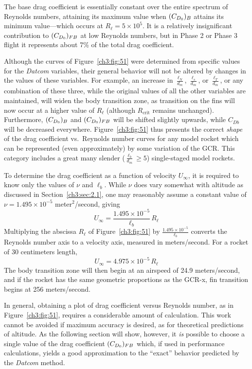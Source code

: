 The base drag coefficient is essentially constant over the entire spectrum of Reynolds numbers,
attaining its maximum value when $(C_{D_0})_B$ attains its minimum value---which occurs at
$R_\ell = 5 \times 10^{5}$. It is a relatively insignificant contribution to $(C_{D_0})_{FB}$ at low
Reynolds numbers, but in Phase 2 or Phase 3 flight it represents about 7\% of the total drag
coefficient.

Although the curves of Figure~\ref{ch3:fig:51} were determined from specific values for the
\emph{Datcom} variables, their general behavior will not be altered by changes in the values of
these variables. For example, an increase in $\frac{\ell_N}{d_m}$, $\frac{\ell_s}{d_m}$, or
$\frac{\ell_T}{d_m}$, or any combination of these three, while the original values of all the
other variables are maintained, will widen the body transition zone, as transition on the fins
will now occur at a higher value of $R_\ell$ (although $R_{\mathrm{crit}}$ remains unchanged).
Furthermore, $(C_{D_0})_B$ and $(C_{D_0})_{FB}$ will be shifted slightly upwards, while $C_{Db}$ will be
decreased everywhere. Figure~\ref{ch3:fig:51} thus presents the correct \emph{shape} of the drag
coefficient vs.\ Reynolds number curves for any model rocket which can be represented (even
approximately) by some variation of the GCR. This category includes a great many slender
($\frac{\ell_b}{d_m} \ge 5$) single-staged model rockets.

To determine the drag coefficient as a function of velocity $U_\infty$, it is required to know
only the values of $\nu$ and $\ell_b$. While $\nu$ does vary somewhat with altitude as discussed
in Section~\ref{ch3:sec:2.1}, one may reasonably assume a constant value of
$\nu = 1.495 \times 10^{-5}$ meter$^{2}$/second, giving
\begin{equation}\label{ch3:eq:207}
U_\infty = \frac{1.495 \times 10^{-5}}{\ell_b}\,R_\ell
\end{equation}
Multiplying the abscissa $R_\ell$ of Figure~\ref{ch3:fig:51} by
$\frac{1.495 \times 10^{-5}}{\ell_b}$ converts the Reynolds number axis to a velocity axis,
measured in meters/second. For a rocket of 30 centimeters length,
\begin{equation*}
U_\infty = 4.975 \times 10^{-5}\,R_\ell
\end{equation*}
The body transition zone will then begin at an airspeed of 24.9 meters/second, and if the rocket
has the same geometric proportions as the GCR-x, fin transition begins at 256 meters/second.

In general, obtaining a plot of drag coefficient versus Reynolds number, as in
Figure~\ref{ch3:fig:51}, requires a considerable amount of calculation. This work cannot be
avoided if maximum accuracy is desired, as for theoretical predictions of altitude. As the
following section will show, however, it \emph{is} possible to choose a single value of the drag
coefficient $(C_{D_0})_{FB}$ which, if used in performance calculations, yields a good approximation
to the ``exact'' behavior predicted by the \emph{Datcom} method.

